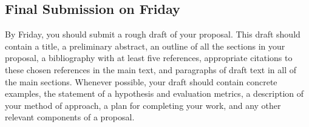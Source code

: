 \subsection*{Final Submission on Friday}

By Friday, you should submit a rough draft of your proposal. This draft should contain a title, a preliminary abstract,
an outline of all the sections in your proposal, a bibliography with at least five references, appropriate citations to
these chosen references in the main text, and paragraphs of draft text in all of the main sections. Whenever possible,
your draft should contain concrete examples, the statement of a hypothesis and evaluation metrics, a description of your
method of approach, a plan for completing your work, and any other relevant components of a proposal.


